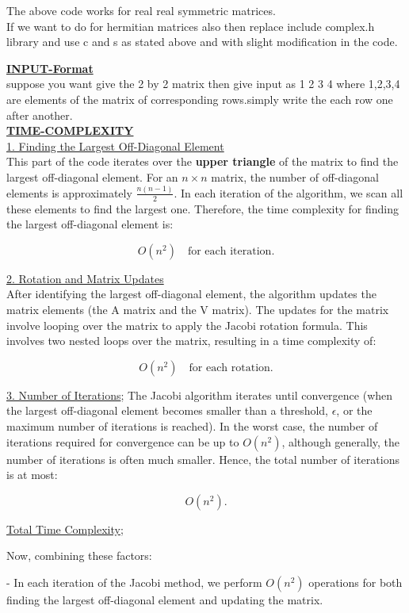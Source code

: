 \documentclass[journal]{IEEEtran}
\begin{document}
The above code works for real real symmetric matrices.\\
If we want to do for hermitian matrices also then replace include complex.h library and use c and s as stated above and with slight modification in the code.

\underline{\textbf{INPUT-Format}}\\
suppose you want give the 2 by 2 matrix then give input as 1 2 3 4 where 1,2,3,4 are elements of the matrix of corresponding rows.simply write the each row one after another.\\
\underline{\textbf{TIME-COMPLEXITY}}\\

\underline{1. Finding the Largest Off-Diagonal Element}\\
This part of the code iterates over the \textbf{upper triangle} of the matrix to find the largest off-diagonal element. For an \( n \times n \) matrix, the number of off-diagonal elements is approximately \( \frac{n(n-1)}{2} \). In each iteration of the algorithm, we scan all these elements to find the largest one. Therefore, the time complexity for finding the largest off-diagonal element is:

\[
O(n^2) \quad \text{for each iteration}.
\]

\underline{2. Rotation and Matrix Updates}\\
After identifying the largest off-diagonal element, the algorithm updates the matrix elements (the A matrix and the V matrix). The updates for the matrix involve looping over the matrix to apply the Jacobi rotation formula. This involves two nested loops over the matrix, resulting in a time complexity of:

\[
O(n^2) \quad \text{for each rotation}.
\]

\underline{3. Number of Iterations};
The Jacobi algorithm iterates until convergence (when the largest off-diagonal element becomes smaller than a threshold, \( \epsilon \), or the maximum number of iterations is reached). In the worst case, the number of iterations required for convergence can be up to \( O(n^2) \), although generally, the number of iterations is often much smaller. Hence, the total number of iterations is at most:

\[
O(n^2).
\]

\underline{Total Time Complexity};

Now, combining these factors:

- In each iteration of the Jacobi method, we perform \( O(n^2) \) operations for both finding the largest off-diagonal element and updating the matrix.
\end{document}
